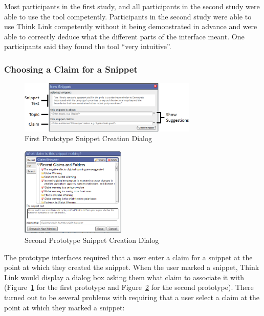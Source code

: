 \documentclass{chi2009}
\begin{document}
Most participants in the first study, and all participants in the second study were able to use the tool competently. Participants in the second study were able to use Think Link competently without it being demonstrated in advance and were able to correctly deduce what the different parts of the interface meant. One participants said they found the tool ``very intuitive''.

\subsubsection{Choosing a Claim for a Snippet}

\begin{figure}[t]
	\includegraphics[width=8.5cm]{../screenshots/oldsnipcreate_diagram.png}
	\caption{First Prototype Snippet Creation Dialog}
	\label{oldsnippetbox}
\end{figure}

\begin{figure}[t]
\begin{center}
	\includegraphics[width=5cm]{../screenshots/newsnip_browseopen.png}
	\caption{Second Prototype Snippet Creation Dialog}
	\label{secondsnippetbox}
\end{center}
\end{figure}

The prototype interfaces required that a user enter a claim for a snippet at the point at which they created the snippet. When the user marked a snippet, Think Link would display a dialog box asking them what claim to associate it with (Figure~\ref{oldsnippetbox} for the first prototype and Figure~\ref{secondsnippetbox} for the second prototype). There turned out to be several problems with requiring that a user select a claim at the point at which they marked a snippet:
\end{document}

